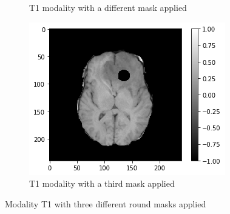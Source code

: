 \begin{figure}[H]
\begin{subfigure}{.33\textwidth}
        \caption{T1 modality with a different mask applied}
    \end{subfigure}
        \begin{subfigure}{.33\textwidth}
        \centering
        \includegraphics[width=\linewidth]{chapters/06_hdm/images_masked/masked_8.png}
        \caption{T1 modality with a third mask applied}
    \end{subfigure}
    \caption{Modality T1 with three different round masks applied}
\end{figure}

